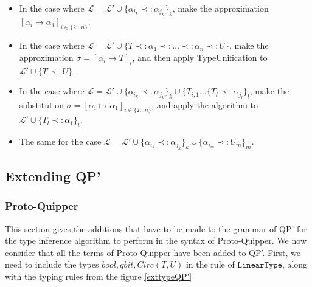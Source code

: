 \begin{itemize}
	\item In the case where $\mathcal{L} = \mathcal{L'} \cup \{\alpha_{i_k} \prec: \alpha_{j_k} \}_k$,
		make the approximation ${[\alpha_i \mapsto \alpha_1]_{i \in \{2 \dots n\}}}$.
		
	\item In the case where $\mathcal{L} = \mathcal{L'} \cup \{T \prec: \alpha_1 \prec: \dots \prec: \alpha_n \prec: U\}$, make the
		approximation $\sigma = [\alpha_i \mapsto T]_i$, and then apply TypeUnification to $\mathcal{L'} \cup \{ T \prec: U \}$.
		
	\item In the case where $\mathcal{L} = \mathcal{L'} \cup \{\alpha_{i_k} \prec: \alpha_{j_k}\}_k \cup
		\{T_{i, 1} \dots \{T_l \prec: \alpha_{j_l} \}_l$, make the substitution $\sigma = {[\alpha_i \mapsto \alpha_1]_{i \in \{2 \dots n\}}}$,
		and apply the algorithm to $\mathcal{L'} \cup \{T_l \prec: \alpha_1\}_l$.
		
	\item The same for the case $\mathcal{L} = \mathcal{L'} \cup \{\alpha_{i_k} \prec: \alpha_{j_k}\}_k \cup \{\alpha_{i_m} \prec: U_m\}_m$.
\end{itemize}

\subsection{Extending QP'}

\subsubsection{Proto-Quipper}

This section gives the additions that have to be made to the grammar of QP' for the type inference algorithm to perform in the syntax
of Proto-Quipper.
We now consider that all the terms of Proto-Quipper have been added to QP'. First, we need to include the types $bool, qbit, Circ(T, U)$
in the rule of $\texttt{LinearType}$, along with the typing rules from the figure \ref{exttypeQP'}

